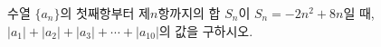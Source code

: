 수열 $\{a_n\}$의 첫째항부터 제$n$항까지의 합 $S_n$이 $S_n=-2n^2+8n$일 때, $|a_1|+|a_2|+|a_3|+\cdots+|a_{10}|$의 값을 구하시오.
